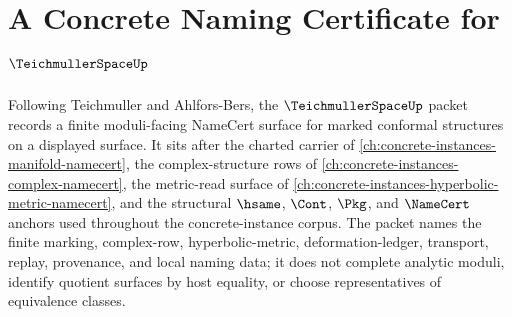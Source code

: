 \chapter{A Concrete Naming Certificate for $\TeichmullerSpaceUp$}
\label{ch:concrete-instances-teichmuller-space-namecert}

Following Teichmuller and Ahlfors-Bers, the $\TeichmullerSpaceUp$ packet records a finite moduli-facing NameCert surface for marked conformal structures on a displayed surface. It sits after the charted carrier of \autoref{ch:concrete-instances-manifold-namecert}, the complex-structure rows of \autoref{ch:concrete-instances-complex-namecert}, the metric-read surface of \autoref{ch:concrete-instances-hyperbolic-metric-namecert}, and the structural $\hsame$, $\Cont$, $\Pkg$, and $\NameCert$ anchors used throughout the concrete-instance corpus. The packet names the finite marking, complex-row, hyperbolic-metric, deformation-ledger, transport, replay, provenance, and local naming data; it does not complete analytic moduli, identify quotient surfaces by host equality, or choose representatives of equivalence classes.

